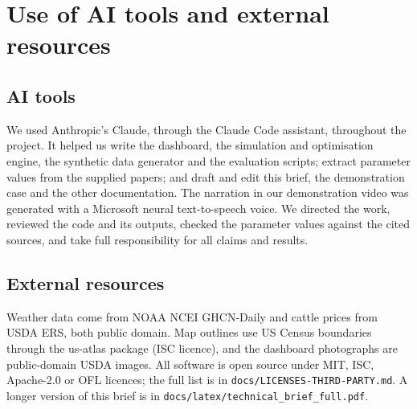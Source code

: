 \documentclass[10pt,letterpaper]{article}
\begin{document}
\section{Use of AI tools and external resources}

\subsection{AI tools}
We used Anthropic's Claude, through the Claude Code assistant, throughout the project. It helped us write the dashboard, the simulation and optimisation engine, the synthetic data generator and the evaluation scripts; extract parameter values from the supplied papers; and draft and edit this brief, the demonstration case and the other documentation. The narration in our demonstration video was generated with a Microsoft neural text-to-speech voice. We directed the work, reviewed the code and its outputs, checked the parameter values against the cited sources, and take full responsibility for all claims and results.

\subsection{External resources}
Weather data come from NOAA NCEI GHCN-Daily and cattle prices from USDA ERS, both public domain. Map outlines use US Census boundaries through the us-atlas package (ISC licence), and the dashboard photographs are public-domain USDA images. All software is open source under MIT, ISC, Apache-2.0 or OFL licences; the full list is in \texttt{docs/LICENSES-THIRD-PARTY.md}. A longer version of this brief is in \texttt{docs/latex/technical\_brief\_full.pdf}.

\clearpage
\end{document}
